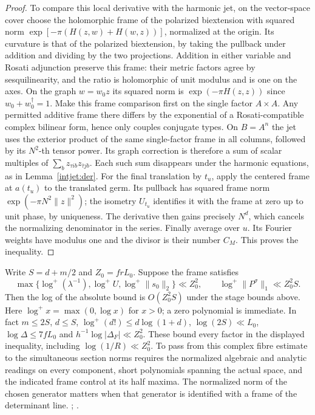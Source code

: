 \begin{proof}
To compare this local derivative with the harmonic jet, on the
vector-space cover choose the holomorphic frame of the polarized
biextension with squared norm
\(\exp[-\pi(H(z,w)+H(w,z))]\), normalized at the origin.
Its curvature is that of the polarized biextension, by taking the
pullback under addition and dividing by the two projections.
Addition in either variable and Rosati adjunction preserve this
frame: their metric factors agree by sesquilinearity, and the ratio
is holomorphic of unit modulus and is one on the axes. On the graph
\(w=w_0z\) its squared norm is \(\exp(-\pi H(z,z))\) since
\(w_0+w_0^\dagger=1\). Make this frame comparison first on the
single factor \(A\times A\). Any permitted additive frame there
differs by the exponential of a Rosati-compatible complex bilinear
form, hence only couples conjugate types. On \(B=A^n\) the jet
uses the exterior product of the same single-factor frame in all
columns, followed by its \(N^2\)-th tensor power. Its graph correction
is therefore a sum of scalar multiples of
\(\sum_b z_{\tau i b}z_{\bar\tau j b}\). Each such sum disappears
under the harmonic equations, as in Lemma~\ref{intjet:der}.
For the final translation
by \(t_u\), apply the centered frame at \(a(t_u)\) to the translated
germ. Its pullback has squared frame norm
\(\exp(-\pi N^2\|z\|^2)\); the isometry \(U_{t_u}\) identifies it
with the frame at zero up to unit phase, by uniqueness. The derivative
then gains precisely \(N^d\), which cancels the normalizing
denominator in the series. Finally average over \(u\). Its Fourier
weights have modulus one and the divisor is their number \(C_M\).
This proves the inequality.
\end{proof}

Write \(S=d+m/2\) and \(Z_0=frL_0\). Suppose the frame satisfies
\[
 \max\{\log^+(\lambda^{-1}),\log^+ U,\log^+\|s_0\|_2\}\ll Z_0^2,
 \qquad \log^+\|P^\sigma\|_1\ll Z_0^2S .
\]
Then the log of the absolute bound is \(O(Z_0^2 S)\) under the
stage bounds above.
Here \(\log^+x=\max(0,\log x)\) for \(x>0\); a zero polynomial is
immediate. In fact \(m\le2S\), \(d\le S\),
\(\log^+(d!)\le d\log(1+d)\), \(\log(2S)\ll L_0\),
\(\log\Delta\le7fL_0\) and \(h^{-1}\log|\Delta_F|\ll Z_0^2\).
These bound every factor in the displayed inequality, including
\(\log(1/R)\ll Z_0^2\). To pass from this complex fibre estimate
to the simultaneous section norms requires the normalized algebraic
and analytic readings on every component, short polynomials spanning
the actual space, and the indicated frame control at its half
maxima. The normalized norm of the chosen generator matters when
that generator is identified with a frame of the determinant line.
;
.
